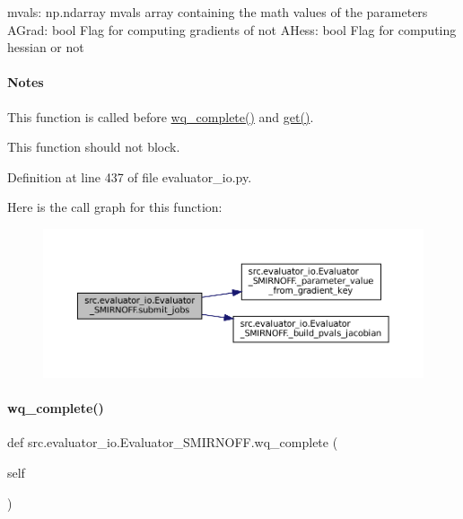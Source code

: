 mvals\+: np.\+ndarray mvals array containing the math values of the parameters A\+Grad\+: bool Flag for computing gradients of not A\+Hess\+: bool Flag for computing hessian or not

\paragraph*{Notes }


\begin{DoxyEnumerate}
\item This function is called before \hyperlink{classsrc_1_1evaluator__io_1_1Evaluator__SMIRNOFF_a111e3b1112012349ffbb658f68a970bd}{wq\+\_\+complete()} and \hyperlink{classsrc_1_1evaluator__io_1_1Evaluator__SMIRNOFF_a609eeee4162c7b26fa40ff0df3eff104}{get()}.
\item This function should not block. 
\end{DoxyEnumerate}

Definition at line 437 of file evaluator\+\_\+io.\+py.

Here is the call graph for this function\+:
\nopagebreak
\begin{figure}[H]
\begin{center}
\leavevmode
\includegraphics[width=350pt]{classsrc_1_1evaluator__io_1_1Evaluator__SMIRNOFF_a27d6f29563811786b154b4c37d2ee845_cgraph}
\end{center}
\end{figure}
\mbox{\label{classsrc_1_1evaluator__io_1_1Evaluator__SMIRNOFF_a111e3b1112012349ffbb658f68a970bd}} 
\paragraph{\texorpdfstring{wq\+\_\+complete()}{wq\_complete()}}
{\footnotesize\ttfamily def src.\+evaluator\+\_\+io.\+Evaluator\+\_\+\+S\+M\+I\+R\+N\+O\+F\+F.\+wq\+\_\+complete (\begin{DoxyParamCaption}\item[{}]{self }\end{DoxyParamCaption})}



